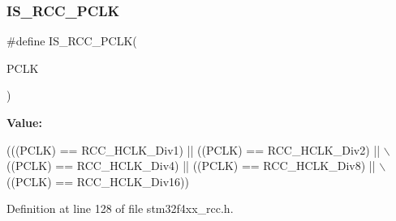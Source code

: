 \subsubsection{\texorpdfstring{I\+S\+\_\+\+R\+C\+C\+\_\+\+P\+C\+LK}{IS\_RCC\_PCLK}}
{\footnotesize\ttfamily \#define I\+S\+\_\+\+R\+C\+C\+\_\+\+P\+C\+LK(\begin{DoxyParamCaption}\item[{}]{P\+C\+LK }\end{DoxyParamCaption})}

{\bfseries Value\+:}
\begin{DoxyCode}
(((PCLK) == RCC\_HCLK\_Div1) || ((PCLK) == RCC\_HCLK\_Div2) || \(\backslash\)
                           ((PCLK) == RCC\_HCLK\_Div4) || ((PCLK) == RCC\_HCLK\_Div8) || \(\backslash\)
                           ((PCLK) == RCC\_HCLK\_Div16))
\end{DoxyCode}


Definition at line 128 of file stm32f4xx\+\_\+rcc.\+h.

